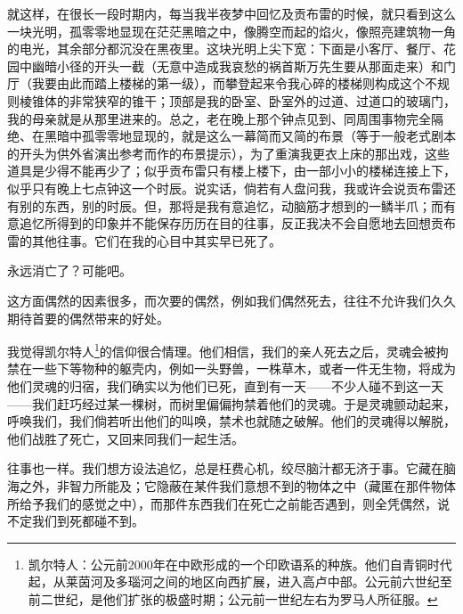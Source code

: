\par 就这样，在很长一段时期内，每当我半夜梦中回忆及贡布雷的时候，就只看到这么一块光明，孤零零地显现在茫茫黑暗之中，像腾空而起的焰火，像照亮建筑物一角的电光，其余部分都沉没在黑夜里。这块光明上尖下宽：下面是小客厅、餐厅、花园中幽暗小径的开头一截（无意中造成我哀愁的祸首斯万先生要从那面走来）和门厅（我要由此而踏上楼梯的第一级），而攀登起来令我心碎的楼梯则构成这个不规则棱锥体的非常狭窄的锥干；顶部是我的卧室、卧室外的过道、过道口的玻璃门，我的母亲就是从那里进来的。总之，老在晚上那个钟点见到、同周围事物完全隔绝、在黑暗中孤零零地显现的，就是这么一幕简而又简的布景（等于一般老式剧本的开头为供外省演出参考而作的布景提示），为了重演我更衣上床的那出戏，这些道具是少得不能再少了；似乎贡布雷只有楼上楼下，由一部小小的楼梯连接上下，似乎只有晚上七点钟这一个时辰。说实话，倘若有人盘问我，我或许会说贡布雷还有别的东西，别的时辰。但，那将是我有意追忆，动脑筋才想到的一鳞半爪；而有意追忆所得到的印象并不能保存历历在目的往事，反正我决不会自愿地去回想贡布雷的其他往事。它们在我的心目中其实早已死了。
\par 永远消亡了？可能吧。
\par 这方面偶然的因素很多，而次要的偶然，例如我们偶然死去，往往不允许我们久久期待首要的偶然带来的好处。
\par 我觉得凯尔特人\footnote{凯尔特人：公元前2000年在中欧形成的一个印欧语系的种族。他们自青铜时代起，从莱茵河及多瑙河之间的地区向西扩展，进入高卢中部。公元前六世纪至前二世纪，是他们扩张的极盛时期；公元前一世纪左右为罗马人所征服。}的信仰很合情理。他们相信，我们的亲人死去之后，灵魂会被拘禁在一些下等物种的躯壳内，例如一头野兽，一株草木，或者一件无生物，将成为他们灵魂的归宿，我们确实以为他们已死，直到有一天——不少人碰不到这一天——我们赶巧经过某一棵树，而树里偏偏拘禁着他们的灵魂。于是灵魂颤动起来，呼唤我们，我们倘若听出他们的叫唤，禁术也就随之破解。他们的灵魂得以解脱，他们战胜了死亡，又回来同我们一起生活。
\par 往事也一样。我们想方设法追忆，总是枉费心机，绞尽脑汁都无济于事。它藏在脑海之外，非智力所能及；它隐蔽在某件我们意想不到的物体之中（藏匿在那件物体所给予我们的感觉之中），而那件东西我们在死亡之前能否遇到，则全凭偶然，说不定我们到死都碰不到。
